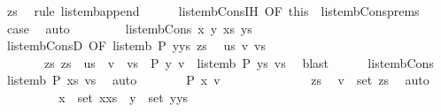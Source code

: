 \begin{isabellebody}
\ zs\ \isamarkupfalse%
\ {\isacharparenleft}rule\ list{\isacharunderscore}emb{\isacharunderscore}append{}{\isacharparenright}\isanewline
\ \ \ \ \isamarkupfalse%
\ list{\isacharunderscore}emb{\isacharunderscore}Cons{\isachardot}IH\ {\isacharbrackleft}OF\ this{\isacharbrackright}\ \ list{\isacharunderscore}emb{\isacharunderscore}Cons{\isachardot}prems\ \isamarkupfalse%
\ {\isacharquery}case\ \isamarkupfalse%
\ auto\isanewline
\ \ \isamarkupfalse%
\isanewline
\ \ \ \ \isamarkupfalse%
\ {\isacharparenleft}list{\isacharunderscore}emb{\isacharunderscore}Cons{}\ x\ y\ xs\ ys{\isacharparenright}\isanewline
\ \ \ \ \isamarkupfalse%
\ list{\isacharunderscore}emb{\isacharunderscore}ConsD\ {\isacharbrackleft}OF\ {\isacartoucheopen}list{\isacharunderscore}emb\ P\ {\isacharparenleft}y{\isacharhash}ys{\isacharparenright}\ zs{\isacartoucheclose}{\isacharbrackright}\ \isamarkupfalse%
\ us\ v\ vs\isanewline
\ \ \ \ \ \ \ zs{\isacharcolon}\ {\isachardoublequoteopen}zs\ {\isacharequal}\ us\ {\isacharat}\ v\ {\isacharhash}\ vs{\isachardoublequoteclose}\ \ {\isachardoublequoteopen}P\ y\ v{\isachardoublequoteclose}\ \ {\isachardoublequoteopen}list{\isacharunderscore}emb\ P\ ys\ vs{\isachardoublequoteclose}\ \isamarkupfalse%
\ blast\isanewline
\ \ \ \ \isamarkupfalse%
\ list{\isacharunderscore}emb{\isacharunderscore}Cons{}\ \isamarkupfalse%
\ {\isachardoublequoteopen}list{\isacharunderscore}emb\ P\ xs\ vs{\isachardoublequoteclose}\ \isamarkupfalse%
\ auto\isanewline
\ \ \ \ \isamarkupfalse%
\ \isamarkupfalse%
\ {\isachardoublequoteopen}P\ x\ v{\isachardoublequoteclose}\isanewline
\ \ \ \ \isamarkupfalse%
\ {\isacharminus}\isanewline
\ \ \ \ \ \ \isamarkupfalse%
\ zs\ \isamarkupfalse%
\ {\isachardoublequoteopen}v\ {\isasymin}\ set\ zs{\isachardoublequoteclose}\ \isamarkupfalse%
\ auto\isanewline
\ \ \ \ \ \ \isamarkupfalse%
\ \isamarkupfalse%
\ {\isachardoublequoteopen}x\ {\isasymin}\ set\ {\isacharparenleft}x{\isacharhash}xs{\isacharparenright}{\isachardoublequoteclose}\ \ {\isachardoublequoteopen}y\ {\isasymin}\ set\ {\isacharparenleft}y{\isacharhash}ys{\isacharparenright}{\isachardoublequoteclose}\ \isamarkupfalse%

\end{isabellebody}
